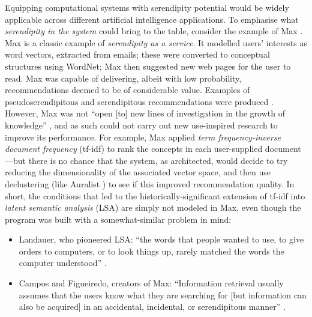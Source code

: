 
Equipping computational systems with serendipity potential would be
widely applicable across different artificial intelligence
applications.
To emphasise what \emph{serendipity in the system} could bring to the table, consider the example of {\sf Max}
\cite{Figueiredo2001,campos2001searching}.  {\sf Max} is a classic example
of \emph{serendipity as a service}.  It modelled users'
interests as word vectors, extracted from emails; these were converted
to conceptual structures using WordNet; {\sf Max} then suggested new
web pages for the user to read.  {\sf Max} was capable of delivering,
albeit with low probability, recommendations deemed to be of
considerable value.  Examples of pseudoserendipitous and serendipitous
recommendations were produced \cite[p.~59]{Figueiredo2001}.
However, {\sf Max} was not ``open [to] new lines of
investigation in the growth of knowledge''
\cite{swanson1997interactive}, and as such could not carry out
new use-inspired research to improve its performance.  For example,
{\sf Max} applied \emph{term frequency-inverse document frequency}
(tf-idf) to rank the concepts in each user-supplied document
\cite[p.~160]{campos2001searching}---but there is no chance that the
system, as architected, would decide to try reducing the dimensionality
of the associated vector space, and then use declustering (like {\sf
  Auralist} \cite{Zhang2011}) to see if this improved recommendation
quality.  In short, the conditions that led to the historically-significant
extension of tf-idf into \emph{latent
  semantic analysis} (LSA) are simply not modeled in {\sf Max}, even
though the program was built with a somewhat-similar problem in mind:
\begin{itemize}
\item Landauer, who pioneered LSA: ``the words that people wanted to
  use, to give orders to computers, or to look things up, rarely
  matched the words the computer understood'' \cite{landauer2003pasteur}.
\item Campos and Figueiredo, creators of {\sf Max}: ``Information retrieval usually
  assumes that the users know what they are searching for [but information can also be acquired] in an accidental, incidental, or
  serendipitous manner'' \cite{campos2001searching}.
\end{itemize}


